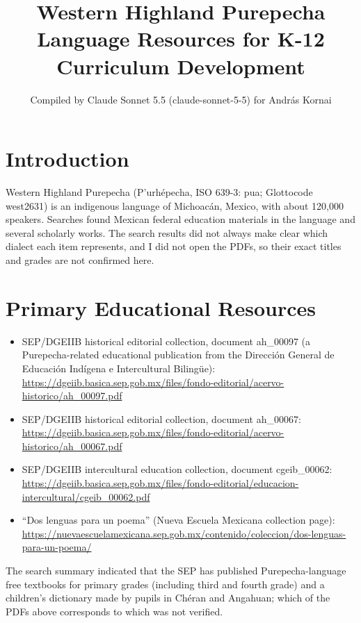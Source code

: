 \documentclass[12pt]{article}
\title{Western Highland Purepecha Language Resources for K-12 Curriculum Development}
\author{Compiled by Claude Sonnet 5.5 (claude-sonnet-5-5) for Andr\'as Kornai}
\date{}
\begin{document}
\maketitle

\section{Introduction}
Western Highland Purepecha (P'urh\'epecha, ISO 639-3: pua; Glottocode west2631) is an indigenous language of Michoac\'an, Mexico, with about 120,000 speakers. Searches found Mexican federal education materials in the language and several scholarly works. The search results did not always make clear which dialect each item represents, and I did not open the PDFs, so their exact titles and grades are not confirmed here.

\section{Primary Educational Resources}
\begin{itemize}
\item SEP/DGEIIB historical editorial collection, document ah\_00097 (a Purepecha-related educational publication from the Direcci\'on General de Educaci\'on Ind\'igena e Intercultural Biling\"ue): \url{https://dgeiib.basica.sep.gob.mx/files/fondo-editorial/acervo-historico/ah_00097.pdf}
\item SEP/DGEIIB historical editorial collection, document ah\_00067: \url{https://dgeiib.basica.sep.gob.mx/files/fondo-editorial/acervo-historico/ah_00067.pdf}
\item SEP/DGEIIB intercultural education collection, document cgeib\_00062: \url{https://dgeiib.basica.sep.gob.mx/files/fondo-editorial/educacion-intercultural/cgeib_00062.pdf}
\item ``Dos lenguas para un poema'' (Nueva Escuela Mexicana collection page): \url{https://nuevaescuelamexicana.sep.gob.mx/contenido/coleccion/dos-lenguas-para-un-poema/}
\end{itemize}
The search summary indicated that the SEP has published Purepecha-language free textbooks for primary grades (including third and fourth grade) and a children's dictionary made by pupils in Ch\'eran and Angahuan; which of the PDFs above corresponds to which was not verified.
\end{document}
